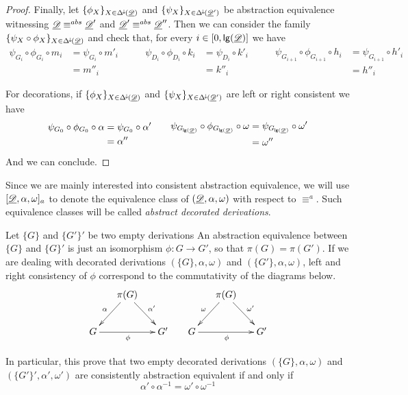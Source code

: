 \begin{proof}
	Finally, let $\{\phi_X\}_{X\in \Delta^{\hspace{-1pt}\downarrow\hspace{-1pt}}(\underline{\mathscr{D}})}$ and $\{\psi_X\}_{X\in \Delta^{\hspace{-1pt}\downarrow\hspace{-1pt}}(\underline{\mathscr{D}}')}$ be abstraction equivalence witnessing $\underline{\mathscr{D}} \equiv^{abs}\underline{\mathscr{D}}'$ and $\underline{\mathscr{D}}'\equiv^{abs}\underline{\mathscr{D}}''$. Then we can consider the family $\{\psi_X\circ \phi_X\}_{X\in \Delta^{\hspace{-1pt}\downarrow\hspace{-1pt}}(\underline{\mathscr{D}})}$  and check that, for every $i\in [0,\mathsf{lg}(\underline{\mathscr{D}})]$ we have
	 \[\begin{split}
	\psi_{G_i}\circ \phi_{G_i}\circ m_i&= \psi_{G_i}\circ m'_i\\&=m''_i 
\end{split} \qquad \begin{split}
	\psi_{D_i}\circ \phi_{D_i}\circ k_i&= \psi_{D_i}\circ k'_i\\&=k''_i
\end{split}\qquad \begin{split}
\psi_{G_{i+1}}\circ \phi_{G_{i+1}}\circ h_i&= \psi_{G_{i+1}}\circ h'_i\\&=h''_i
\end{split} \]
	
	For decorations, if $\{\phi_X\}_{X\in \Delta^{\hspace{-1pt}\downarrow\hspace{-1pt}}(\underline{\mathscr{D}})}$ and $\{\psi_X\}_{X\in \Delta^{\hspace{-1pt}\downarrow\hspace{-1pt}}(\underline{\mathscr{D}}')}$ are left or right consistent we have
	 \[\begin{split}
		\psi_{G_0}\circ \phi_{G_0}\circ \alpha&= \psi_{G_0}\circ \alpha'\\&=\alpha'' 
	\end{split} \qquad \begin{split}
		\psi_{G_{\mathsf{lg}(\underline{\mathscr{D}})}}\circ \phi_{G_{\mathsf{lg}(\underline{\mathscr{D}})}}\circ \omega&= \psi_{G_{\mathsf{lg}(\underline{\mathscr{D}})}}\circ \omega'\\&=\omega''
	\end{split}\]
	And we can conclude.
\end{proof}

\begin{notation}
	Since we are mainly interested into consistent abstraction equivalence, we will use  $[\underline{\mathscr{D}}, \alpha, \omega]_a$ to denote the equivalence class of  $(\underline{\mathscr{D}}, \alpha, \omega)$ with respect to $\equiv^a$.
	Such equivalence classes will be called  \emph{abstract decorated derivations}.  
\end{notation}

\begin{example}\label{rem:empty}
	Let $\{G\}$ and  $\{G'\}'$ be two empty derivations  An abstraction equivalence between $\{G\}$ and $\{G\}'$ is just an isomorphism $\phi\colon G\to G'$, so that $\pi(G)=\pi(G')$. If we are dealing with decorated derivations $(\{G\}, \alpha, \omega)$ and $(\{G'\}, \alpha, \omega)$,  left and right consistency of $\phi $ correspond to the commutativity of the diagrams below.
	\[\xymatrix@C=15pt{&\pi(G) \ar[dr]^{\alpha'} \ar[dl]_{\alpha}&&& \pi(G) \ar[dr]^{\omega'} \ar[dl]_{\omega}\\ G\ar[rr]_{\phi} && G' &G \ar[rr]_{\phi} && G' } \]
	
	In particular, this prove that two empty decorated derivations $(\{G\},\alpha, \omega) $ and $(\{G'\}',\alpha', \omega')$ are consistently abstraction equivalent if and only if
	\[	\alpha'\circ \alpha^{-1}=\omega'\circ \omega^{-1}\]
\end{example}

